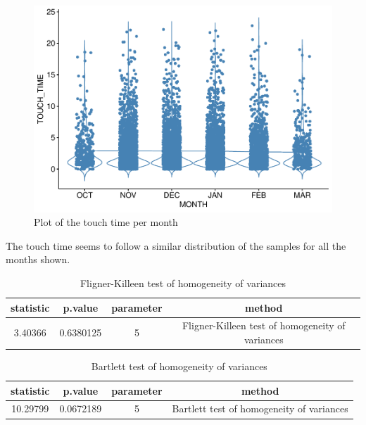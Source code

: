 \documentclass[
  11pt,
]{article}
\begin{document}
\begin{figure}

{\centering \includegraphics{index_files/figure-latex/ggline-touchtime-month-1} 

}

\caption{Plot of the touch time per month}\label{fig:ggline-touchtime-month}
\end{figure}

The touch time seems to follow a similar distribution of the samples for all the months shown.

\begin{table}[H]

\caption{\label{tab:second-test1}Fligner-Killeen test of homogeneity of variances}
\centering
\begin{tabular}[t]{cccc}
\toprule
statistic & p.value & parameter & method\\
\midrule
3.40366 & 0.6380125 & 5 & Fligner-Killeen test of homogeneity of variances\\
\bottomrule
\end{tabular}
\end{table}

\begin{table}[H]

\caption{\label{tab:second-test2}Bartlett test of homogeneity of variances}
\centering
\begin{tabular}[t]{cccc}
\toprule
statistic & p.value & parameter & method\\
\midrule
10.29799 & 0.0672189 & 5 & Bartlett test of homogeneity of variances\\
\bottomrule
\end{tabular}
\end{table}
\end{document}
